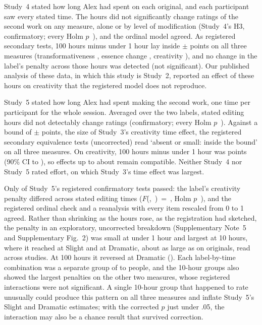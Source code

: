 Study~4 stated how long Alex had spent on each original, and each participant saw every stated time. The hours did not significantly change ratings of the second work on any measure, alone or by level of modification (Study~4's H3, confirmatory; every Holm $p$~\SFourCreatSourceTimePHolm), and the ordinal model agreed. As registered secondary tests, 100 hours minus under 1 hour lay inside $\pm$\SourceBound{} points on all three measures (transformativeness \SFourTransTimeContrastEst, essence change \SFourEssTimeContrastEst, creativity \SFourCreatTimeContrastEst), and no change in the label's penalty across those hours was detected (not significant). Our published analysis of these data,\cite{kamper2025originalsin} in which this study is Study~2, reported an effect of these hours on creativity that the registered model does not reproduce.

Study~5 stated how long Alex had spent making the second work, one time per participant for the whole session. Averaged over the two labels, stated editing hours did not detectably change ratings (confirmatory; every Holm $p$~\SFiveCreatEditTimePHolm). Against a bound of $\pm$\SFiveEditTimeBound{} points, the size of Study~3's creativity time effect, the registered secondary equivalence tests (uncorrected) read `absent or small: inside the bound' on all three measures. On creativity, 100 hours minus under 1 hour was \SFiveCreatEditTimeContrastEst{} points (90\% CI \SFiveCreatEditTimeContrastLoNinety{} to \SFiveCreatEditTimeContrastHiNinety), so effects up to about \SFiveCreatEditTimeContrastHiNinety{} remain compatible. Neither Study~4 nor Study~5 rated effort, on which Study~3's time effect was largest.

Only \SFiveNConfirmatoryHolmSignificant{} of Study~5's \SFiveNConfirmatory{} registered confirmatory tests passed: the label's creativity penalty differed across stated editing times ($F$(\SFiveCreatSourceByEditTimeDfNum,~\SFiveCreatSourceByEditTimeDfDen)~=~\SFiveCreatSourceByEditTimeF, Holm $p$~\SFiveCreatSourceByEditTimePHolm), and the registered ordinal check and a reanalysis with every item rescaled from 0 to 1 agreed. Rather than shrinking as the hours rose, as the registration had sketched, the penalty in an exploratory, uncorrected breakdown (Supplementary Note~5 and Supplementary Fig.~2) was small at under 1 hour and largest at 10 hours, where it reached \XSTimeCheckSFiveCreatPenaltyTenHoursSlightEst{} at Slight and \XSTimeCheckSFiveCreatPenaltyTenHoursDramaticEst{} at Dramatic, about as large as on originals, read across studies. At 100 hours it reversed at Dramatic (\XSTimeCheckSFiveCreatPenaltyHundredHoursDramaticEst). Each label-by-time combination was a separate group of \SFiveNCellMin{} to \SFiveNCellMax{} people, and the 10-hour groups also showed the largest penalties on the other two measures, whose registered interactions were not significant. A single 10-hour group that happened to rate unusually could produce this pattern on all three measures and inflate Study~5's Slight and Dramatic estimates; with the corrected $p$ just under .05, the interaction may also be a chance result that survived correction.

